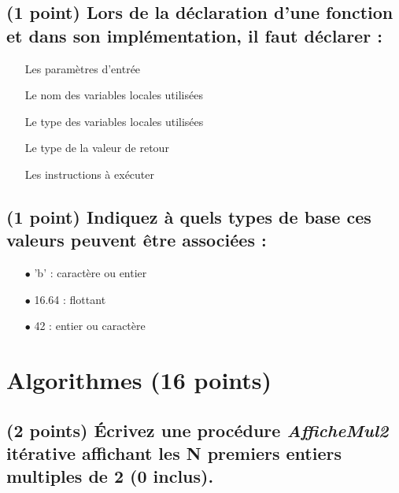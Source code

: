 \documentclass[11pt,a4paper]{article}
\begin{document}
\bigskip

\subsection{(1 point) Lors de la déclaration d'une fonction et dans son implémentation, il faut déclarer : }

\bigskip

\begin{itemize}
  \item[\checkmark] Les paramètres d'entrée   \phantom{(}
  \item[\checkmark] Le nom des variables locales utilisées   \phantom{(}
  \item[\checkmark] Le type des variables locales utilisées   \phantom{(}
  \item[\checkmark] Le type de la valeur de retour   \phantom{(}
  \item[\checkmark] Les instructions à exécuter   \phantom{(}
\end{itemize}

\bigskip

\subsection{(1 point) Indiquez à quels types de base ces valeurs peuvent être associées : }

\bigskip

\begin{itemize}
  \item[$\bullet$] 'b'   : caractère ou entier \phantom{(} \\
  \item[$\bullet$] 16.64 : flottant            \phantom{(} \\
  \item[$\bullet$] 42    : entier ou caractère \phantom{(} \\
\end{itemize}

\vfillLast

\newpage


\section{Algorithmes (16 points)}

\subsection{(2 points) \'Ecrivez une procédure \og \textit{AfficheMul2} \fg{} itérative affichant les N premiers entiers multiples de 2 (0 inclus). }
\end{document}
